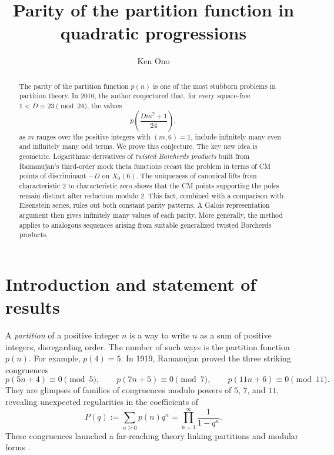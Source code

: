 \documentclass[11pt]{amsart}
\title[Parity in quadratic progressions]
{Parity of the partition function in quadratic progressions}
\author{Ken Ono}
\theoremstyle{remark}
\numberwithin{equation}{section}
\begin{document}
\begin{abstract}
The parity of the partition function $p(n)$ is one of the most
stubborn problems in partition theory.  In 2010, the author conjectured
that, for every square-free $1<D\equiv 23\pmod{24}$, the values
\[
p\!\left(\frac{Dm^2+1}{24}\right),
\]
as $m$ ranges over the positive integers with $(m,6)=1$, include infinitely
many even and infinitely many odd terms.  We prove
this conjecture.
The key new idea is geometric.  Logarithmic derivatives of
\emph{twisted Borcherds products} built from Ramanujan's third-order
mock theta functions recast the problem in terms of CM points of
discriminant $-D$ on $X_0(6)$.  The uniqueness of canonical lifts from
characteristic $2$ to characteristic zero shows that the CM points
supporting the poles remain distinct after reduction modulo $2$.
This fact, combined with a comparison with
Eisenstein series, rules out both constant parity patterns. A Galois representation argument then
gives infinitely many values of each parity.
More generally,
the method applies to analogous sequences arising from suitable generalized
twisted Borcherds products.
\end{abstract}
\maketitle

\section{Introduction and statement of results}

A \emph{partition} of a positive integer $n$ is a way to write $n$ as a sum
of positive integers, disregarding order.  The number of such ways is the
partition function $p(n)$.  For example, $p(4)=5$.  In 1919, Ramanujan proved
\cite{Ramanujan} the three striking congruences
\[
 p(5n+4)\equiv0\pmod5,\qquad
 p(7n+5)\equiv0\pmod7,\qquad
 p(11n+6)\equiv0\pmod{11}.
\]
They are glimpses of families of congruences modulo powers of $5$, $7$, and
$11$, revealing unexpected regularities in the coefficients of
\begin{equation}\label{eq:Pgen}
 P(q):=\sum_{n\geq0}p(n)q^n
 =\prod_{n=1}^{\infty}\frac{1}{1-q^n}.
\end{equation}
These congruences launched a far-reaching theory linking partitions and
modular forms 
\cite{AhlgrenOno2001,AndrewsTP,Atkin,Atkin1968,Ono2000,Watson1938}.
\end{document}
